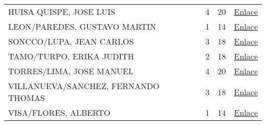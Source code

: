 \begin{table}[h]
\begin{tabular}{lrrl}
		HUISA QUISPE, JOSE LUIS             & 4                         & 20                       & \href{https://drive.google.com/drive/folders/1Xh0H-x6oXW8MLrL_3HSyH8S3zDMuTcyi?usp=sharing}{Enlace}    \\
		LEON/PAREDES, GUSTAVO MARTIN        & 1                         & 14                       & \href{https://drive.google.com/drive/folders/1Xh0H-x6oXW8MLrL_3HSyH8S3zDMuTcyi?usp=sharing}{Enlace}    \\
		SONCCO/LUPA, JEAN CARLOS            & 3                         & 18                       & \href{https://drive.google.com/drive/folders/1Xh0H-x6oXW8MLrL_3HSyH8S3zDMuTcyi?usp=sharing}{Enlace}    \\
		TAMO/TURPO, ERIKA JUDITH            & 2                         & 18                       & \href{https://drive.google.com/drive/folders/1Xh0H-x6oXW8MLrL_3HSyH8S3zDMuTcyi?usp=sharing}{Enlace}    \\
		TORRES/LIMA, JOSE MANUEL            & 4                         & 20                       & \href{https://drive.google.com/drive/folders/1Xh0H-x6oXW8MLrL_3HSyH8S3zDMuTcyi?usp=sharing}{Enlace}    \\
		VILLANUEVA/SANCHEZ, FERNANDO THOMAS & 3                         & 18                       & \href{https://drive.google.com/drive/folders/1Xh0H-x6oXW8MLrL_3HSyH8S3zDMuTcyi?usp=sharing}{Enlace}    \\
		VISA/FLORES, ALBERTO                & 1                         & 14                       & \href{https://drive.google.com/drive/folders/1Xh0H-x6oXW8MLrL_3HSyH8S3zDMuTcyi?usp=sharing}{Enlace}   \\ \hline 
	\end{tabular}
\end{table}



